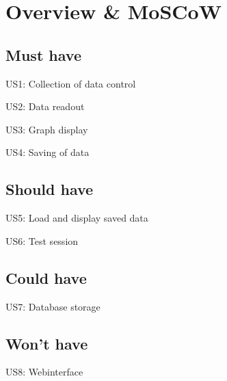 \section{Overview \& MoSCoW}

\subsection{Must have}

US1: Collection of data control

US2: Data readout

US3: Graph display

US4: Saving of data

\subsection{Should have}

US5: Load and display saved data

US6: Test session

\subsection{Could have}

US7: Database storage

\subsection{Won't have}

US8: Webinterface